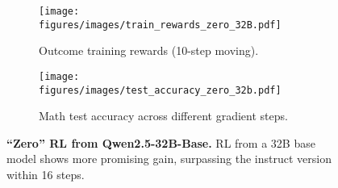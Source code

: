 \begin{figure*}[tbh]
    \centering
    \begin{subfigure}{0.48\textwidth}
        \centering
        \texttt{[image: figures/images/train\_rewards\_zero\_32B.pdf]}
        \caption{Outcome training rewards (10-step moving).} %
    \end{subfigure}
    \hfill %
    \begin{subfigure}{0.50\textwidth}
        \centering
        \texttt{[image: figures/images/test\_accuracy\_zero\_32b.pdf]}
        \caption{Math test accuracy across different gradient steps.} %
    \end{subfigure}
    \caption{\textbf{``Zero'' RL from Qwen2.5-32B-Base.} RL from a 32B base model shows more promising gain, surpassing the instruct version within 16 steps. } %
    \label{fig:zero_32}
\end{figure*}


